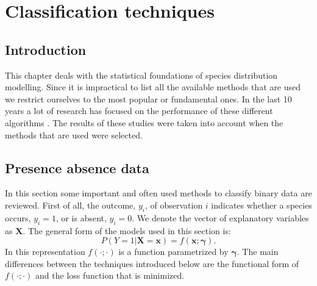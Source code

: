 \chapter{Classification techniques}
\label{ch:ClassificationTechniques}

\section{Introduction}
This chapter deals with the statistical foundations of species distribution modelling. Since it is impractical to list all the available methods that are used we restrict ourselves to the most popular or fundamental ones. In the last 10 years a lot of research has focused on the performance of these different algorithms \parencite[e.g.][]{elith*_novel_2006,segurado_evaluation_2004}. The results of these studies were taken into account when the methods that are used were selected.

\section{Presence absence data}
\label{sec:PresenceAbsenceData}

In this section some important and often used methods to classify binary data are reviewed. First of all, the outcome, $y_i$, of observation $i$ indicates whether a species occurs, $y_i = 1$, or is absent, $y_i=0$. We denote the vector of explanatory variables as $\bm{X}$. The general form of the models used in this section is:
\begin{equation}
\label{FundEq}
P(Y=1|\bm{X} = \bm{x}) = f(\bm{x}; \bm{\gamma}).
\end{equation}
In this representation $f(\cdot;\cdot)$ is a function parametrized by $\bm{\gamma}$. The main differences between the techniques introduced below are the functional form of $f(\cdot;\cdot)$ and the loss function that is minimized.

